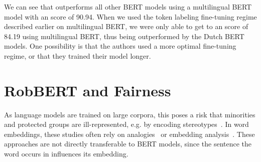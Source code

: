\documentclass[11pt,a4paper]{article}
\begin{document}
\begin{table}[htb]
\centering
\caption{NER for various models,  score calculated with the CoNLL 2002 evaluation script, except for  which used the Seqeval Python library, * from \citet{wuBeto2019}, ** from \citet{brandsen2019bert}, *** from \citet{devriesBERTje2019}.}
\label{tab:results-tokens-ner} 

\end{table}

We can see that \citep{wuBeto2019} outperforms all other BERT models using a multilingual BERT model with an  score of 90.94.
When we used the token labeling fine-tuning regime described earlier on multilingual BERT, we were only able to get to an  score of 84.19 using multilingual BERT, thus being outperformed by the Dutch BERT models.
One possibility is that the authors used a more optimal fine-tuning regime, or that they trained their model longer.



\section{RobBERT and Fairness}

As language models are trained on large corpora, this poses a risk that minorities and protected groups are ill-represented, e.g. by encoding stereotypes~\citep{bolukbasi2016man, zhaoGender2019, gonen-goldberg-2019-lipstick}.
In word embeddings, these studies often rely on analogies~\citep{bolukbasi2016man,caliskanSemantics2017}
or embedding analysis~\cite{gonen-goldberg-2019-lipstick}.
These approaches are not directly transferable to BERT models, 
since the sentence the word occurs in influences its embedding.
\end{document}
